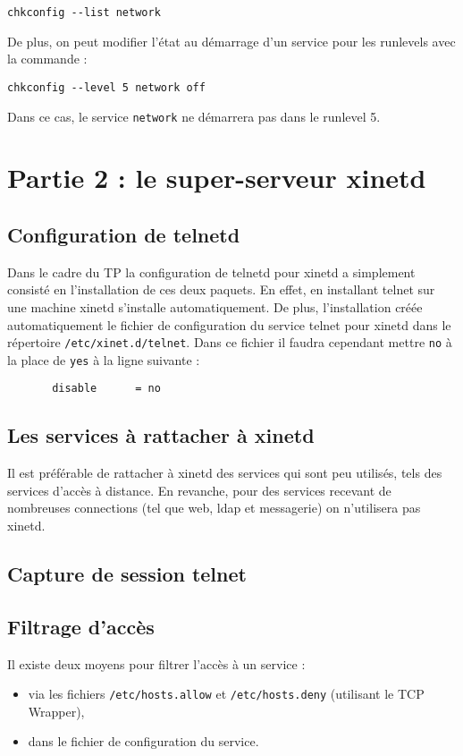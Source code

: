 \documentclass[12pt,a4paper,notitlepage]{article}
\begin{document}
\begin{lstlisting}
chkconfig --list network
\end{lstlisting}
De plus, on peut modifier l'état au démarrage d'un service pour les runlevels avec la commande :
\begin{lstlisting}
chkconfig --level 5 network off
\end{lstlisting}
Dans ce cas, le service \texttt{network} ne démarrera pas dans le runlevel 5.


\section{Partie 2 : le super-serveur xinetd}
\subsection{Configuration de telnetd}
 
Dans le cadre du TP la configuration de telnetd pour xinetd a simplement consisté en l'installation de ces deux paquets. En effet, en installant telnet sur une machine xinetd s'installe automatiquement. De plus, l'installation créée automatiquement le fichier de configuration du service telnet pour xinetd dans le répertoire \texttt{/etc/xinet.d/telnet}. Dans ce fichier il faudra cependant mettre \texttt{no} à la place de \texttt{yes} à la ligne suivante :
\begin{lstlisting}
       disable		= no
\end{lstlisting}

\subsection{Les services à rattacher à xinetd}
Il est préférable de rattacher à xinetd des services qui sont peu utilisés, tels des services d'accès à distance. En revanche, pour des services recevant de nombreuses connections (tel que web, ldap et messagerie) on n'utilisera pas xinetd.

\subsection{Capture de session telnet}

\subsection{Filtrage d'accès}

Il existe deux moyens pour filtrer l'accès à un service : 
\begin{itemize}
\item via les fichiers \texttt{/etc/hosts.allow} et \texttt{/etc/hosts.deny} (utilisant le TCP Wrapper),
\item dans le fichier de configuration du service.
\end{itemize}
\end{document}
